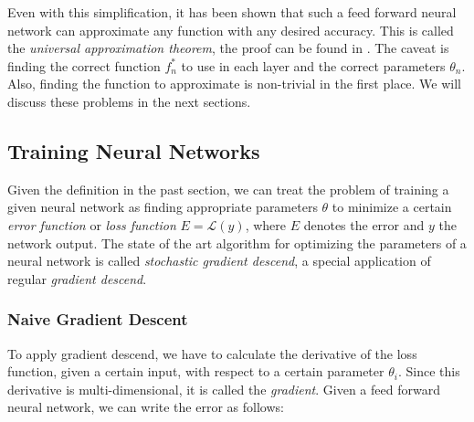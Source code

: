 \begin{minipage}{\linewidth}
	\label{fig:simple_feed_forward_nn}
	\hspace{1cm}
\end{minipage}


Even with this simplification, it has been shown that such a feed forward neural network can approximate any function with any desired accuracy. This is called the \textit{universal approximation theorem}, the proof can be found in \cite{hornik1989multilayer}. The caveat is finding the correct function $f^*_n$ to use in each layer and the correct parameters $\theta_n$. Also, finding the function to approximate is non-trivial in the first place. We will discuss these problems in the next sections. 

\subsection{Training Neural Networks}

Given the definition in the past section, we can treat the problem of training a given neural network as finding appropriate parameters $\theta$ to minimize a certain \textit{error function} or \textit{loss function} $E = \mathcal{L}(y)$, where $E$ denotes the error and $y$ the network output. The state of the art algorithm for optimizing the parameters of a neural network is called \textit{stochastic gradient descend}, a special application of regular \textit{gradient descend}. 
\subsubsection{Naive Gradient Descent}
To apply gradient descend, we have to calculate the derivative of the loss function, given a certain input, with respect to a certain parameter $\theta_i$. Since this derivative is multi-dimensional, it is called the \textit{gradient}. Given a feed forward neural network, we can write the error as follows:

